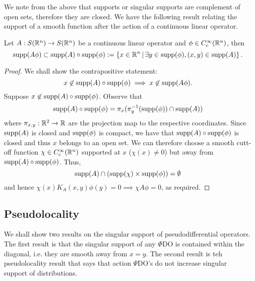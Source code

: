 \documentclass{article}
\begin{document}
We note from the above that supports or singular supports are complement of open sets, therefore they are closed. 
We have the following result relating the support of a smooth function after the action of a continuous linear operator. 
\begin{fprop}
    Let $A: S({\mathbb R}^n) \to S({\mathbb R}^n)$ be a continuous linear operator and $\phi \in C^\infty_c({\mathbb R}^n)$, then
    \[
    \mathrm{supp}(A \phi) \subset \mathrm{supp}(A) \circ \mathrm{supp}(\phi) := \left\{x \in {\ensuremath {\mathbb R}}^n \, | \, \exists y \in \mathrm{supp}(\phi), (x, y) \in \mathrm{supp}(A) \right\}. 
    \]
\end{fprop}
\begin{proof}
    We shall show the contrapositive statement:
    \[
    x \not \in \mathrm{supp}(A) \circ \mathrm{supp}(\phi) \implies x \not \in \mathrm{supp}(A \phi). 
    \]
    Suppose $x \not \in \mathrm{supp}(A) \circ \mathrm{supp}(\phi)$. Observe that 
    \[
    \mathrm{supp}(A) \circ \mathrm{supp}(\phi) = \pi_x(\pi_y^{-1}(\mathrm{supp}(\phi)) \cap \mathrm{supp}(A))
    \]
    where $\pi_{x, y} : {\mathbb R}^2 \to {\ensuremath {\mathbb R}}$ are the projection map to the respective coordinates. Since $\mathrm{supp}(A)$ is closed and $\mathrm{supp}(\phi)$ is compact, we have that $\mathrm{supp}(A) \circ \mathrm{supp}(\phi)$ is closed and thus $x$ belongs to an open set. We can therefore choose a smooth cutt-off function $\chi \in C^\infty_c({\mathbb R}^n)$ supported at $x$ ($\chi(x) \neq 0$) but away from $\mathrm{supp}(A) \circ \mathrm{supp}(\phi)$. Thus, 
    \[
    \mathrm{supp}(A) \cap (\mathrm{supp}(\chi) \times \mathrm{supp}(\phi)) = \emptyset
    \]
    and hence $\chi(x) K_A(x, y) \phi(y) = 0 \implies \chi A \phi = 0$, as required. 
\end{proof}



\subsection{Pseudolocality} 
We shall show two results on the singular support of pseudodifferential operators. The first result is that the singular support of any $\Phi$DO is contained within the diagonal, i.e. they are smooth away from $x = y$. The second result is teh pseudolocality result that says that action $\Psi$DO's do not increase singular support of distributions. 
\end{document}
